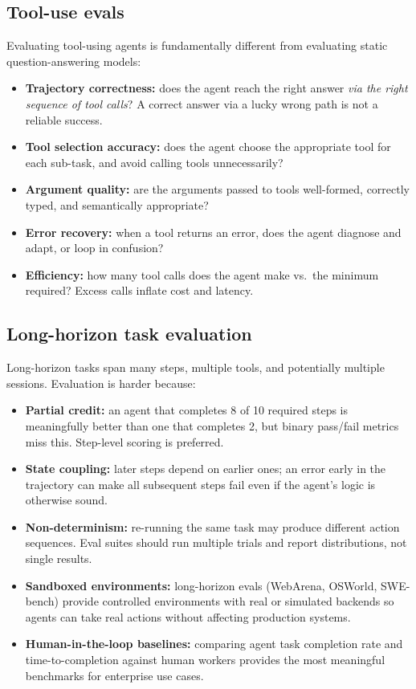 
\subsection{Tool-use evals}

Evaluating tool-using agents is fundamentally different from evaluating static
question-answering models:

\begin{itemize}
  \item \textbf{Trajectory correctness:} does the agent reach the right answer
    \emph{via the right sequence of tool calls}? A correct answer via a lucky wrong
    path is not a reliable success.
  \item \textbf{Tool selection accuracy:} does the agent choose the appropriate
    tool for each sub-task, and avoid calling tools unnecessarily?
  \item \textbf{Argument quality:} are the arguments passed to tools well-formed,
    correctly typed, and semantically appropriate?
  \item \textbf{Error recovery:} when a tool returns an error, does the agent
    diagnose and adapt, or loop in confusion?
  \item \textbf{Efficiency:} how many tool calls does the agent make vs.\ the
    minimum required? Excess calls inflate cost and latency.
\end{itemize}

\subsection{Long-horizon task evaluation}

Long-horizon tasks span many steps, multiple tools, and potentially multiple sessions.
Evaluation is harder because:

\begin{itemize}
  \item \textbf{Partial credit:} an agent that completes 8 of 10 required steps is
    meaningfully better than one that completes 2, but binary pass/fail metrics miss
    this. Step-level scoring is preferred.
  \item \textbf{State coupling:} later steps depend on earlier ones; an error early
    in the trajectory can make all subsequent steps fail even if the agent's logic
    is otherwise sound.
  \item \textbf{Non-determinism:} re-running the same task may produce different
    action sequences. Eval suites should run multiple trials and report distributions,
    not single results.
  \item \textbf{Sandboxed environments:} long-horizon evals (WebArena, OSWorld,
    SWE-bench) provide controlled environments with real or simulated backends so
    agents can take real actions without affecting production systems.
  \item \textbf{Human-in-the-loop baselines:} comparing agent task completion rate
    and time-to-completion against human workers provides the most meaningful
    benchmarks for enterprise use cases.
\end{itemize}

